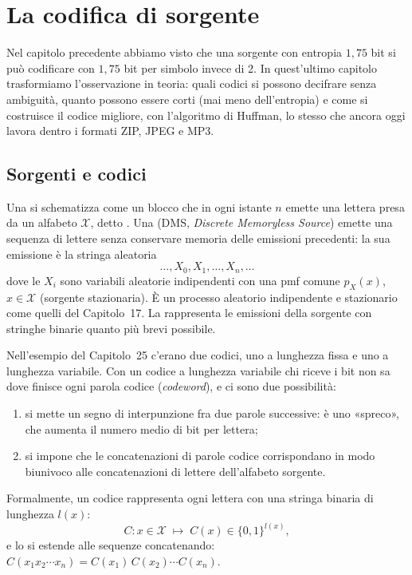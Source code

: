 \chapter{La codifica di sorgente}

Nel capitolo precedente abbiamo visto che una sorgente con entropia $1{,}75$ bit si può codificare con $1{,}75$ bit per
simbolo invece di 2. In quest'ultimo capitolo trasformiamo l'osservazione in teoria: quali codici si possono decifrare
senza ambiguità, quanto possono essere corti (mai meno dell'entropia) e come si costruisce il codice migliore, con
l'algoritmo di Huffman, lo stesso che ancora oggi lavora dentro i formati ZIP, JPEG e MP3.

\section{Sorgenti e codici}

Una  si schematizza come un blocco che in ogni istante $n$ emette una lettera presa da un
alfabeto $\mathcal{X}$, detto . Una  (DMS,
\emph{Discrete Memoryless Source}) emette una sequenza di lettere senza conservare memoria delle emissioni precedenti: la
sua emissione è la stringa aleatoria
\[ \ldots, X_0, X_1, \ldots, X_n, \ldots \]
dove le $X_i$ sono variabili aleatorie indipendenti con una pmf comune $p_X(x)$, $x \in \mathcal{X}$ (sorgente
stazionaria). È un processo aleatorio indipendente e stazionario come quelli del Capitolo~17. La  rappresenta le emissioni della sorgente con stringhe binarie quanto più brevi possibile.

Nell'esempio del Capitolo~25 c'erano due codici, uno a lunghezza fissa e uno a lunghezza variabile. Con un codice a
lunghezza variabile chi riceve i bit non sa dove finisce ogni parola codice (\emph{codeword}), e ci sono due
possibilità:
\begin{enumerate}
  \item si mette un segno di interpunzione fra due parole successive: è uno «spreco», che aumenta il numero medio di bit
        per lettera;
  \item si impone che le concatenazioni di parole codice corrispondano in modo biunivoco alle concatenazioni di lettere
        dell'alfabeto sorgente.
\end{enumerate}
Formalmente, un codice rappresenta ogni lettera con una stringa binaria di lunghezza $l(x)$:
\[ C : x \in \mathcal{X} \;\longmapsto\; C(x) \in \{0, 1\}^{l(x)} , \]
e lo si estende alle sequenze concatenando: $C(x_1 x_2 \cdots x_n) = C(x_1)\, C(x_2) \cdots C(x_n)$.

